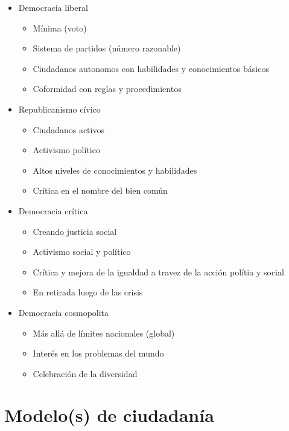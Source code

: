 \documentclass[]{beamer} %
\begin{document}
\begin{frame} [allowframebreaks]
	\begin{itemize}
		\item Democracia liberal
			\begin{itemize}
				\item Mínima (voto)
				\item Sistema de partidos (número razonable)
				\item Ciudadanos autonomos con habilidades y conocimientos básicos
				\item Coformidad con reglas y procedimientos
			\end{itemize}
		
		\item Republicanismo cívico
			\begin{itemize}
				\item Ciudadanos activos
				\item Activismo político
				\item Altos niveles de conocimientos y habilidades
				\item Crítica en el nombre del bien común
			\end{itemize}
			
	\framebreak
		\item Democracia crítica
			\begin{itemize}
				\item Creando justicia social
				\item Activismo social y político
				\item Crítica y mejora de la igualdad a travez de la acción polítia y social
				\item En retirada luego de las crisis
			\end{itemize}
		\item Democracia cosmopolita 
			\begin{itemize}
				\item Más allá de límites nacionales (global)
				\item Interés en los problemas del mundo
				\item Celebración de la diversidad
			\end{itemize}
		
	
	\end{itemize}
\end{frame}

\section{Modelo(s) de ciudadanía}
\end{document}
